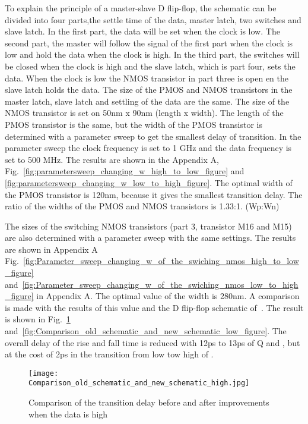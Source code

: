 To explain the principle of a master-slave D flip-flop, the schematic can be divided into four parts,the settle time of the data, master latch, two switches and slave latch. In the first part, the data will be set when the clock is low. The second part, the master will follow the signal of the first part when the clock is low and hold the data when the clock is high. In the third part, the switches will be closed when the clock is high and the slave latch, which is part four, sets the data. When the clock is low the NMOS transistor in part three is open en the slave latch holds the data. 
The size of the PMOS and NMOS transistors in the master latch, slave latch and settling of the data are the same. The size of the NMOS transistor is set on 50nm x 90nm (length x width). The length of the PMOS transistor is the same, but the width of the PMOS transistor is determined with a parameter sweep to get the smallest delay of transition. In the parameter sweep the clock frequency is set to 1 GHz and the data frequency is set to 500 MHz. The results are shown in the Appendix A, Fig.~\ref{fig:parametersweep_changing_w_high_to_low_figure} and \ref{fig:parametersweep_changing_w_low_to_high_figure}. The optimal width of the PMOS transistor is 120nm, because it gives the smallest transition delay. The ratio of the widths of the PMOS and NMOS transistors is 1.33:1. (Wp:Wn)

The sizes of the switching NMOS transistors (part 3, transistor M16 and M15) are also determined with a parameter sweep with the same settings. The results are shown in Appendix A Fig.~\ref{fig:Parameter_sweep_changing_w_of_the_swiching_nmos_high_to_low_figure} and~\ref{fig:Parameter_sweep_changing_w_of_the_swiching_nmos_low_to_high_figure} in Appendix A. The optimal value of the width is 280nm. A comparison is made with the results of this value and the D flip-flop schematic of~\cite{powerdac}. The result is shown in Fig.~\ref{fig:Comparison_old_schematic_and_new_schematic_high_figure} and~\ref{fig:Comparison_old_schematic_and_new_schematic_low_figure}. The overall delay of the rise and fall time is reduced with 12ps to 13ps of Q and , but at the cost of 2ps in the transition from low tow high of . 

\begin{figure}[h]
\texttt{[image: Comparison\_old\_schematic\_and\_new\_schematic\_high.jpg]}
\caption{Comparison of the transition delay before and after improvements when the data is high }
\label{fig:Comparison_old_schematic_and_new_schematic_high_figure}
\end{figure}

